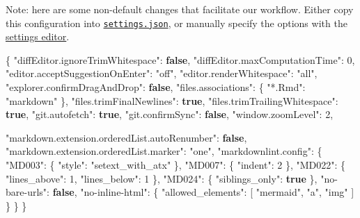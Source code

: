 \documentclass[
]{book}
\newenvironment{Shaded}{\begin{snugshade}}{\end{snugshade}}
\newcommand{\DataTypeTok}[1]{\textcolor[rgb]{0.13,0.29,0.53}{#1}}
\newcommand{\DecValTok}[1]{\textcolor[rgb]{0.00,0.00,0.81}{#1}}
\newcommand{\FunctionTok}[1]{\textcolor[rgb]{0.00,0.00,0.00}{#1}}
\newcommand{\KeywordTok}[1]{\textcolor[rgb]{0.13,0.29,0.53}{\textbf{#1}}}
\newcommand{\OtherTok}[1]{\textcolor[rgb]{0.56,0.35,0.01}{#1}}
\newcommand{\StringTok}[1]{\textcolor[rgb]{0.31,0.60,0.02}{#1}}
\begin{document}
Note: here are some non-default changes that facilitate our workflow. Either copy this configuration into \href{https://code.visualstudio.com/docs/getstarted/tips-and-tricks\#_tune-your-settings}{\texttt{settings.json}}, or manually specify the options with the \href{https://code.visualstudio.com/docs/getstarted/settings}{settings editor}.

\begin{Shaded}
\begin{Highlighting}[]
\FunctionTok{\{}
  \DataTypeTok{"diffEditor.ignoreTrimWhitespace"}\FunctionTok{:} \KeywordTok{false}\FunctionTok{,}
  \DataTypeTok{"diffEditor.maxComputationTime"}\FunctionTok{:} \DecValTok{0}\FunctionTok{,}
  \DataTypeTok{"editor.acceptSuggestionOnEnter"}\FunctionTok{:} \StringTok{"off"}\FunctionTok{,}
  \DataTypeTok{"editor.renderWhitespace"}\FunctionTok{:} \StringTok{"all"}\FunctionTok{,}
  \DataTypeTok{"explorer.confirmDragAndDrop"}\FunctionTok{:} \KeywordTok{false}\FunctionTok{,}
  \DataTypeTok{"files.associations"}\FunctionTok{:} \FunctionTok{\{}
      \DataTypeTok{"*.Rmd"}\FunctionTok{:} \StringTok{"markdown"}
  \FunctionTok{\},}
  \DataTypeTok{"files.trimFinalNewlines"}\FunctionTok{:} \KeywordTok{true}\FunctionTok{,}
  \DataTypeTok{"files.trimTrailingWhitespace"}\FunctionTok{:} \KeywordTok{true}\FunctionTok{,}
  \DataTypeTok{"git.autofetch"}\FunctionTok{:} \KeywordTok{true}\FunctionTok{,}
  \DataTypeTok{"git.confirmSync"}\FunctionTok{:} \KeywordTok{false}\FunctionTok{,}
  \DataTypeTok{"window.zoomLevel"}\FunctionTok{:} \DecValTok{2}\FunctionTok{,}

  \DataTypeTok{"markdown.extension.orderedList.autoRenumber"}\FunctionTok{:} \KeywordTok{false}\FunctionTok{,}
  \DataTypeTok{"markdown.extension.orderedList.marker"}\FunctionTok{:} \StringTok{"one"}\FunctionTok{,}
  \DataTypeTok{"markdownlint.config"}\FunctionTok{:} \FunctionTok{\{}
      \DataTypeTok{"MD003"}\FunctionTok{:} \FunctionTok{\{} \DataTypeTok{"style"}\FunctionTok{:} \StringTok{"setext\_with\_atx"} \FunctionTok{\},}
      \DataTypeTok{"MD007"}\FunctionTok{:} \FunctionTok{\{} \DataTypeTok{"indent"}\FunctionTok{:} \DecValTok{2} \FunctionTok{\},}
      \DataTypeTok{"MD022"}\FunctionTok{:} \FunctionTok{\{} \DataTypeTok{"lines\_above"}\FunctionTok{:} \DecValTok{1}\FunctionTok{,}
                  \DataTypeTok{"lines\_below"}\FunctionTok{:} \DecValTok{1} \FunctionTok{\},}
      \DataTypeTok{"MD024"}\FunctionTok{:} \FunctionTok{\{} \DataTypeTok{"siblings\_only"}\FunctionTok{:} \KeywordTok{true} \FunctionTok{\},}
      \DataTypeTok{"no{-}bare{-}urls"}\FunctionTok{:} \KeywordTok{false}\FunctionTok{,}
      \DataTypeTok{"no{-}inline{-}html"}\FunctionTok{:} \FunctionTok{\{}
        \DataTypeTok{"allowed\_elements"}\FunctionTok{:} \OtherTok{[}
          \StringTok{"mermaid"}\OtherTok{,}
          \StringTok{"a"}\OtherTok{,}
          \StringTok{"img"}
        \OtherTok{]}
      \FunctionTok{\}}
  \FunctionTok{\}}
\FunctionTok{\}}
\end{Highlighting}
\end{Shaded}
\end{document}
